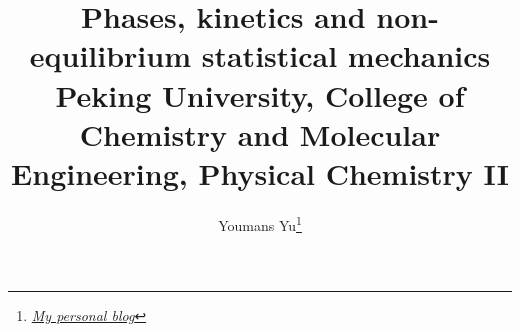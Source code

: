 \documentclass{article}
\begin{document}
    \title{\LARGE{Phases, kinetics and non-equilibrium statistical mechanics}\\\large{Peking University, College of Chemistry and Molecular Engineering, Physical Chemistry II}}
    \author{Youmans Yu\footnote{\href{https://www.youmans.top/}{\textit{My personal blog}}}}
    \maketitle
    \pagestyle{fancynotes}
    
\end{document}
